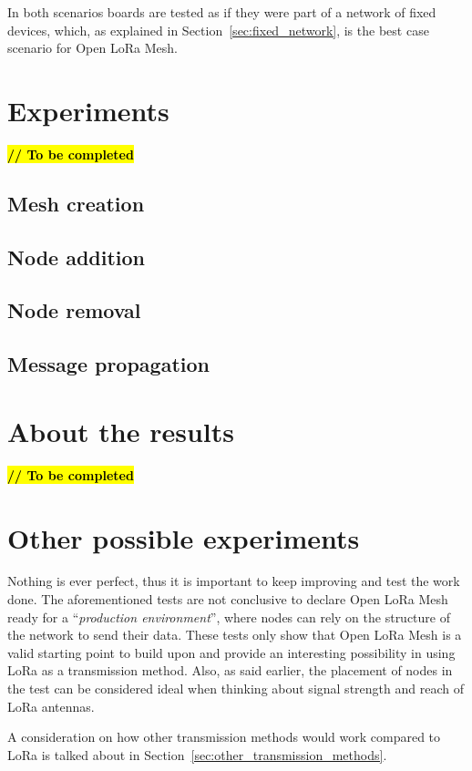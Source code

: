 		In both scenarios boards are tested as if they were part of a network of fixed devices, which, as explained in Section~\ref{sec:fixed_network}, is the best case scenario for Open LoRa Mesh.
	
	\section{Experiments}
		
		\textbf{\textcolor{red}{\hl{// To be completed}}}
		
		\subsection{Mesh creation}
		
		\subsection{Node addition}

		\subsection{Node removal}
		
		\subsection{Message propagation}
	
	\section{About the results}
	
		\textbf{\textcolor{red}{\hl{// To be completed}}}
			
	
	\section{Other possible experiments}
	
		Nothing is ever perfect, thus it is important to keep improving and test the work done.
		The aforementioned tests are not conclusive to declare Open LoRa Mesh ready for a ``\textit{production environment}'', where nodes can rely on the structure of the network to send their data.
		These tests only show that Open LoRa Mesh is a valid starting point to build upon and provide an interesting possibility in using LoRa as a transmission method.
		Also, as said earlier, the placement of nodes in the test can be considered ideal when thinking about signal strength and reach of LoRa antennas.
		
		A consideration on how other transmission methods would work compared to LoRa is talked about in Section~\ref{sec:other_transmission_methods}.